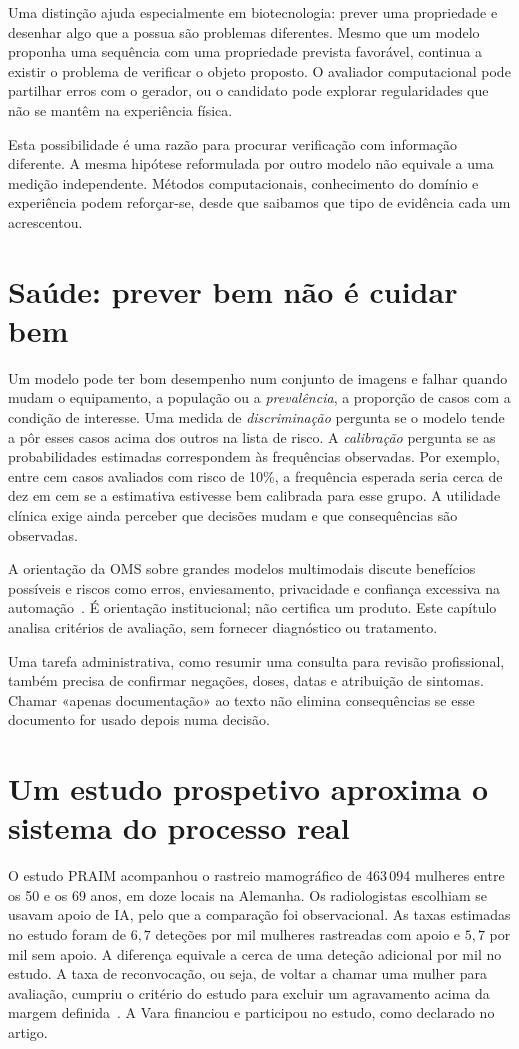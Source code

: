 Uma distinção ajuda especialmente em biotecnologia: prever uma propriedade e desenhar algo que a possua são problemas diferentes. Mesmo que um modelo proponha uma sequência com uma propriedade prevista favorável, continua a existir o problema de verificar o objeto proposto. O avaliador computacional pode partilhar erros com o gerador, ou o candidato pode explorar regularidades que não se mantêm na experiência física.

Esta possibilidade é uma razão para procurar verificação com informação diferente. A mesma hipótese reformulada por outro modelo não equivale a uma medição independente. Métodos computacionais, conhecimento do domínio e experiência podem reforçar-se, desde que saibamos que tipo de evidência cada um acrescentou.

\section{Saúde: prever bem não é cuidar bem}
Um modelo pode ter bom desempenho num conjunto de imagens e falhar quando mudam o equipamento, a população ou a \emph{prevalência}, a proporção de casos com a condição de interesse. Uma medida de \emph{discriminação} pergunta se o modelo tende a pôr esses casos acima dos outros na lista de risco. A \emph{calibração} pergunta se as probabilidades estimadas correspondem às frequências observadas. Por exemplo, entre cem casos avaliados com risco de 10\%, a frequência esperada seria cerca de dez em cem se a estimativa estivesse bem calibrada para esse grupo. A utilidade clínica exige ainda perceber que decisões mudam e que consequências são observadas.

A orientação da OMS sobre grandes modelos multimodais discute benefícios possíveis e riscos como erros, enviesamento, privacidade e confiança excessiva na automação~\citep{who2024}. É orientação institucional; não certifica um produto. Este capítulo analisa critérios de avaliação, sem fornecer diagnóstico ou tratamento.

Uma tarefa administrativa, como resumir uma consulta para revisão profissional, também precisa de confirmar negações, doses, datas e atribuição de sintomas. Chamar «apenas documentação» ao texto não elimina consequências se esse documento for usado depois numa decisão.

\section{Um estudo prospetivo aproxima o sistema do processo real}
O estudo PRAIM acompanhou o rastreio mamográfico de 463\,094 mulheres entre os 50 e os 69 anos, em doze locais na Alemanha. Os radiologistas escolhiam se usavam apoio de IA, pelo que a comparação foi observacional. As taxas estimadas no estudo foram de $6{,}7$ deteções por mil mulheres rastreadas com apoio e $5{,}7$ por mil sem apoio. A diferença equivale a cerca de uma deteção adicional por mil no estudo. A taxa de reconvocação, ou seja, de voltar a chamar uma mulher para avaliação, cumpriu o critério do estudo para excluir um agravamento acima da margem definida~\citep{eisemann2025}. A Vara financiou e participou no estudo, como declarado no artigo.

